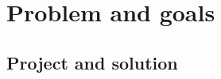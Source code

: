 \section{Problem and goals}
\label{sec:Problem-and-goals}

\subsection{Project and solution}
\label{subsec:Project-or-Solution}

